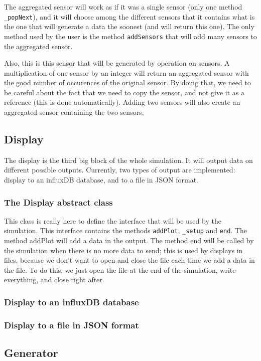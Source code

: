 The aggregated sensor will work as if it was a single sensor (only one method \verb!_popNext!), and it will choose among the different sensors that it contains what is the one that will generate a data the soonest (and will return this one). The only method used by the user is the method \verb!addSensors! that will add many sensors to the aggregated sensor.

Also, this is this sensor that will be generated by operation on sensors. A multiplication of one sensor by an integer will return an aggregated sensor with the good number of occurences of the original sensor. By doing that, we need to be careful about the fact that we need to copy the sensor, and not give it as a reference (this is done automatically). Adding two sensors will also create an aggregated sensor containing the two sensors.


\subsection{Display}

The display is the third big block of the whole simulation. It will output data
on different possible outputs. Currently, two types of output are implemented:
display to an influxDB database, and to a file in JSON format.

\subsubsection{The Display abstract class}

This class is really here to define the interface that will be used
by the simulation. This interface contains the methods \verb!addPlot!,
\verb!_setup! and \verb!end!. The method addPlot will add a data in the
output. The method end will be called by the simulation when there is no more
data to send; this is used by displays in files, because we don't want to open
and close the file each time we add a data in the file. To do this, we just
open the file at the end of the simulation, write everything, and close right
after.

\subsubsection{Display to an influxDB database}


\subsubsection{Display to a file in JSON format}



\subsection{Generator}

